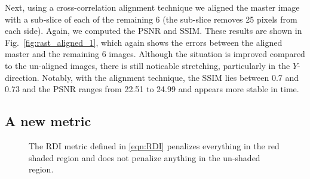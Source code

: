 \documentclass[twocolumn,oneside]{IEEEtran/IEEEtran}
\begin{document}
Next, using a cross-correlation alignment technique
we aligned the master image with a sub-slice of each of
the remaining 6 (the sub-slice removes 25 pixels from each side). Again, we
computed the PSNR and SSIM. These results are shown in
Fig.~\ref{fig:rast_aligned_1}, which again shows the errors between the
aligned master and the remaining 6 images. Although the situation is improved
compared to the un-aligned images, there is still noticable stretching,
particularly in the $Y$-direction. Notably, with the alignment technique,
the SSIM lies between 0.7 and 0.73 and the PSNR ranges from 22.51 to 24.99 and appears more stable in time.






\subsection{A new metric}
\begin{figure}[t!]
  \centering
  
  \caption{The RDI metric defined in \eqref{eqn:RDI} penalizes everything in the
    red shaded region and does not penalize anything in the un-shaded region.}
  \label{fig:damage_illustrate}
\end{figure}
\end{document}
